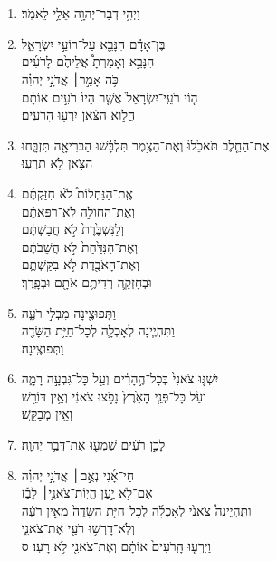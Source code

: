 \documentclass[12pt,a4paper,titlepage]{article}
\def \pslabelsep{-0.9em} %
\def \psleftmargin{0em} %
\begin{document}
\section*{}
\begin{enumerate}[leftmargin=\psleftmargin, labelsep = \pslabelsep, label={\arabic*}, font=\color{\pscolor}\small\textsuperscript, parsep=0em, itemsep=0em, topsep=0em ]
\item \texthebrew{וַיְהִ֥י דְבַר־יְהוָ֖ה אֵלַ֥י לֵאמֹֽר׃}
\item \texthebrew{ בֶּן־אָדָ֕ם הִנָּבֵ֖א עַל־רוֹעֵ֣י יִשְׂרָאֵ֑ל \\ הִנָּבֵ֣א וְאָמַרְתָּ֩ אֲלֵיהֶ֙ם לָרֹעִ֜ים \\ כֹּ֥ה אָמַ֣ר׀ אֲדֹנָ֣י יְהוִ֗ה \\ ה֤וֹי רֹעֵֽי־יִשְׂרָאֵל֙ אֲשֶׁ֤ר הָיוּ֙ רֹעִ֣ים אוֹתָ֔ם \\ הֲל֣וֹא הַצֹּ֔אן יִרְע֖וּ הָרֹעִֽים׃}
\item \texthebrew{אֶת־הַחֵ֤לֶב תֹּאכֵ֙לוּ֙ וְאֶת־הַצֶּ֣מֶר תִּלְבָּ֔שׁוּ הַבְּרִיאָ֖ה תִּזְבָּ֑חוּ \\ הַצֹּ֖אן לֹ֥א תִרְעֽוּ׃}
\item \texthebrew{אֶֽת־הַנַּחְלוֹת֩ לֹ֙א חִזַּקְתֶּ֜ם \\ וְאֶת־הַחוֹלָ֣ה לֹֽא־רִפֵּאתֶ֗ם \\ וְלַנִּשְׁבֶּ֙רֶת֙ לֹ֣א חֲבַשְׁתֶּ֔ם \\ וְאֶת־הַנִּדַּ֙חַת֙ לֹ֣א הֲשֵׁבֹתֶ֔ם \\ וְאֶת־הָאֹבֶ֖דֶת לֹ֣א בִקַּשְׁתֶּ֑ם \\ וּבְחָזְקָ֛ה רְדִיתֶ֥ם אֹתָ֖ם וּבְפָֽרֶךְ׃}
\item \texthebrew{וַתְּפוּצֶ֖ינָה מִבְּלִ֣י רֹעֶ֑ה \\ וַתִּהְיֶ֧ינָה לְאָכְלָ֛ה לְכָל־חַיַּ֥ת הַשָּׂדֶ֖ה \\ וַתְּפוּצֶֽינָה׃}
\item \texthebrew{יִשְׁגּ֤וּ צֹאנִי֙ בְּכָל־הֶ֣הָרִ֔ים וְעַ֖ל כָּל־גִּבְעָ֣ה רָמָ֑ה \\ וְעַ֙ל כָּל־פְּנֵ֤י הָאָ֙רֶץ֙ נָפֹ֣צוּ צֹאנִ֔י וְאֵ֥ין דּוֹרֵ֖שׁ \\ וְאֵ֥ין מְבַקֵּֽשׁ׃}
\item \texthebrew{לָכֵ֣ן רֹעִ֔ים שִׁמְע֖וּ אֶת־דְּבַ֥ר יְהוָֽה׃}
\item \texthebrew{חַי־אָ֜נִי נְאֻ֣ם׀ אֲדֹנָ֣י יְהוִ֗ה \\ אִם־לֹ֣א יַ֣עַן הֱיֽוֹת־צֹאנִ֣י׀ לָבַ֡ז \\ וַתִּֽהְיֶינָה֩ צֹאנִ֙י לְאָכְלָ֜ה לְכָל־חַיַּ֤ת הַשָּׂדֶה֙ מֵאֵ֣ין רֹעֶ֔ה \\ וְלֹֽא־דָרְשׁ֥וּ רֹעַ֖י אֶת־צֹאנִ֑י \\ וַיִּרְע֤וּ הָֽרֹעִים֙ אוֹתָ֔ם וְאֶת־צֹאנִ֖י לֹ֥א רָעֽוּ׃ ס}

\end{enumerate}
\end{document}
